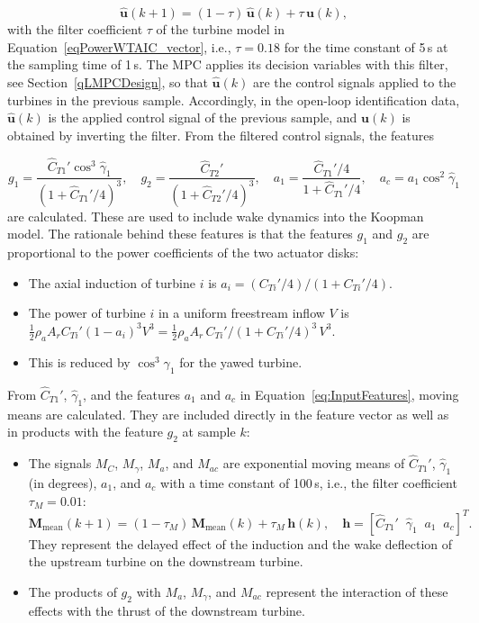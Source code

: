 \begin{equation} \label{eq:FiltInputs}
    \hat{\bm{u}}(k+1) = (1-\tau)\,\hat{\bm{u}}(k) + \tau\,\bm{u}(k),
\end{equation}
with the filter coefficient $\tau$ of the turbine model in Equation~\eqref{eqPowerWTAIC_vector}, i.e., $\tau = 0.18$ for the time constant of 5\,s at the sampling time of 1\,s. The MPC applies its decision variables with this filter, see Section~\ref{qLMPCDesign}, so that $\hat{\bm{u}}(k)$ are the control signals applied to the turbines in the previous sample. Accordingly, in the open-loop identification data, $\hat{\bm{u}}(k)$ is the applied control signal of the previous sample, and $\bm{u}(k)$ is obtained by inverting the filter. From the filtered control signals, the features

\begin{equation} \label{eq:InputFeatures}
    g_1 = \frac{\hat{C}_{T1}'\cos^3\hat{\gamma}_1}{(1 + \hat{C}_{T1}'/4)^3}, \quad g_2 = \frac{\hat{C}_{T2}'}{(1 + \hat{C}_{T2}'/4)^3}, \quad a_1 = \frac{\hat{C}_{T1}'/4}{1 + \hat{C}_{T1}'/4}, \quad a_c = a_1\cos^2\hat{\gamma}_1
\end{equation}
are calculated.
%
These are used to include wake dynamics into the Koopman model. The rationale behind these features is that the features $g_1$ and $g_2$ are proportional to the power coefficients of the two actuator disks:
\begin{itemize}
    \item The axial induction of turbine $i$ is $a_i = (C_{Ti}'/4)/(1+C_{Ti}'/4)$.
    \item The power of turbine $i$ in a uniform freestream inflow $V$ is $\frac{1}{2}\rho_a A_r C_{Ti}' (1-a_i)^3 V^3 = \frac{1}{2}\rho_a A_r\, C_{Ti}'/(1+C_{Ti}'/4)^3\, V^3$.
    \item This is reduced by $\cos^3\gamma_1$ for the yawed turbine.
\end{itemize}
From $\hat{C}_{T1}'$, $\hat{\gamma}_1$, and the features $a_1$ and $a_c$ in Equation~\eqref{eq:InputFeatures}, moving means are calculated. They are included directly in the feature vector as well as in products with the feature $g_2$ at sample $k$:
\begin{itemize}
    \item The signals $M_{C}$, $M_{\gamma}$, $M_{a}$, and $M_{ac}$ are exponential moving means of $\hat{C}_{T1}'$, $\hat{\gamma}_1$ (in degrees), $a_1$, and $a_c$ with a time constant of 100\,s, i.e., the filter coefficient $\tau_M = 0.01$:
    \begin{equation} \label{eq:MovingMeans}
        \bm{M}_{\text{mean}}(k+1) = (1 - \tau_M)\, \bm{M}_{\text{mean}}(k) + \tau_M\,\bm{h}(k), \quad \bm{h} = [\hat{C}_{T1}' \;\; \hat{\gamma}_1 \;\; a_1 \;\; a_c]^T.
    \end{equation}
    They represent the delayed effect of the induction and the wake deflection of the upstream turbine on the downstream turbine.
    \item The products of $g_2$ with $M_{a}$, $M_{\gamma}$, and $M_{ac}$ represent the interaction of these effects with the thrust of the downstream turbine.
\end{itemize}
